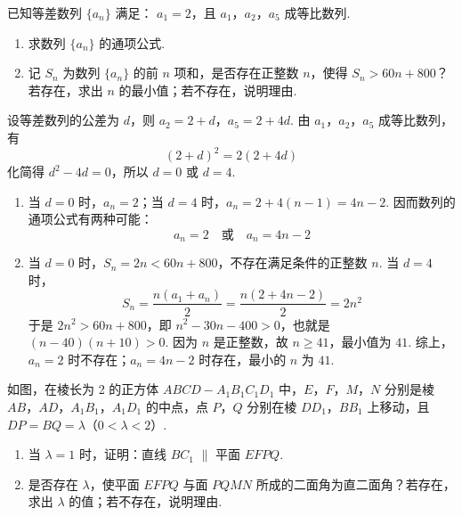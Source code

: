 \begin{problem}
已知等差数列 \(\{a_{n}\}\) 满足： \(a_{1} = 2\)，且 \(a_{1}\)，\(a_{2}\)，\(a_{5}\) 成等比数列.
\begin{enumerate}
\item 求数列 \(\{a_{n}\}\) 的通项公式.
\item 记 \(S_{n}\) 为数列 \(\{a_{n}\}\) 的前 \(n\) 项和，是否存在正整数 \(n\)，使得 \(S_{n} > 60n + 800\)？若存在，求出 \(n\) 的最小值；若不存在，说明理由.
\end{enumerate}
\end{problem}

\begin{solution}
设等差数列的公差为 \(d\)，则 \(a_2=2+d\)，\(a_5=2+4d\). 由 \(a_1\)，\(a_2\)，\(a_5\) 成等比数列，有
\[
(2+d)^2=2(2+4d)
\]
化简得 \(d^2-4d=0\)，所以 \(d=0\) 或 \(d=4\).

\begin{enumerate}
\item 当 \(d=0\) 时，\(a_n=2\)；当 \(d=4\) 时，\(a_n=2+4(n-1)=4n-2\). 因而数列的通项公式有两种可能：
\[
a_n=2\quad\text{或}\quad a_n=4n-2
\]
\item 当 \(d=0\) 时，\(S_n=2n<60n+800\)，不存在满足条件的正整数 \(n\). 当 \(d=4\) 时，
\[
S_n=\frac{n(a_1+a_n)}{2}=\frac{n(2+4n-2)}{2}=2n^2
\]
于是 \(2n^2>60n+800\)，即 \(n^2-30n-400>0\)，也就是 \((n-40)(n+10)>0\). 因为 \(n\) 是正整数，故 \(n\geqslant41\)，最小值为 \(41\). 综上，\(a_n=2\) 时不存在；\(a_n=4n-2\) 时存在，最小的 \(n\) 为 \(41\).
\end{enumerate}
\end{solution}

\begin{problem}
如图，在棱长为 2 的正方体 \(ABCD - A_{1}B_{1}C_{1}D_{1}\) 中，\(E\)，\(F\)，\(M\)，\(N\) 分别是棱 \(AB\)，\(AD\)，\(A_{1}B_{1}\)，\(A_{1}D_{1}\) 的中点，点 \(P\)，\(Q\) 分别在棱 \(DD_{1}\)，\(BB_{1}\) 上移动，且 \(DP = BQ = \lambda\)（\(0 < \lambda < 2\)）.
\begin{enumerate}
\item 当 \(\lambda = 1\) 时，证明：直线 \(BC_{1}\) \(\parallel\) 平面 \(EFPQ\).
\item 是否存在 \(\lambda\)，使平面 \(EFPQ\) 与面 \(PQMN\) 所成的二面角为直二面角？若存在，求出 \(\lambda\) 的值；若不存在，说明理由.
\end{enumerate}

\end{problem}

